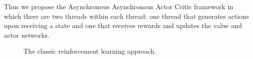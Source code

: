 \documentclass[sigconf]{acmart}
\begin{document}
Thus we propose the Asynchronous Asynchronous Actor Critic framework in which there are two threads within each thread: one thread that generates actions upon receiving a state and one that receives rewards and updates the value and actor networks. 

\begin{figure}

\caption{The classic reinforcement learning approach.\protect\footnotemark}
\label{fig:reinforcement}
\end{figure}
 


\end{document}
